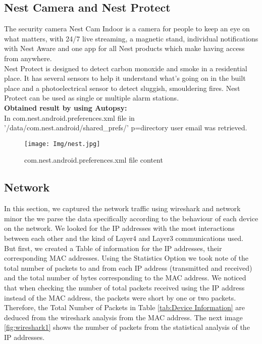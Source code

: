 \documentclass{easychair}
\begin{document}
\subsection{Nest Camera and Nest Protect}

The security camera Nest Cam Indoor is a camera for people to keep an eye on what matters, with 24/7 live streaming, a magnetic stand, individual notifications with Nest Aware and one app for all Nest products which make having access from anywhere\cite{pari_10}.\\

Nest Protect is designed to detect carbon monoxide and smoke in a residential place.  It has several sensors to help it understand what's going on in the built place and a photoelectrical sensor to detect sluggish, smouldering fires. Nest Protect can be used as single or multiple alarm stations\cite{pari_11}.\\

\textbf{Obtained result by using Autopsy:}\\
In com.nest.android.preferences.xml file in '/data/com.nest.android/shared\_prefs/' p=directory user email was retrieved.\\

\begin{figure}[H]
    \centering
    \texttt{[image: Img/nest.jpg]}
    \caption{com.nest.android.preferences.xml file content}
    \label{fig:my_label}
\end{figure}

\subsection{Network}
In this section, we captured the network traffic using wireshark and network minor the we parse the data specifically according to the behaviour of each device on the network. We looked for the IP addresses with the most interactions between each other and the kind of Layer4 and Layer3 communications used. 
\\
But first, we created a Table of information for the IP addresses, their corresponding MAC addresses. Using the Statistics Option  we took note of the total number of packets to and from each IP address (transmitted and received) and the total number of bytes corresponding to the MAC address.
We noticed that when checking the number of total packets received using the IP address instead of the MAC address, the packets were short by one or two packets. Therefore, the Total Number of Packets in Table \ref{tab:Device Information} are deduced from the wireshark analysis from the MAC address. The next image \ref{fig:wireshark1} shows the number of packets from the statistical analysis of the IP addresses. 
\end{document}
